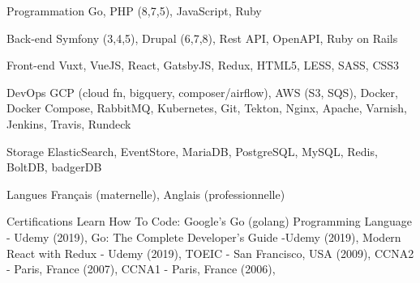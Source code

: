 

\begin{cvskills}

  \cvskill
    {Programmation} %
    {Go, PHP (8,7,5), JavaScript, Ruby} %

  \cvskill
    {Back-end} %
    {Symfony (3,4,5), Drupal (6,7,8), Rest API, OpenAPI, Ruby on Rails} %

  \cvskill
    {Front-end} %
    {Vuxt, VueJS, React, GatsbyJS, Redux, HTML5, LESS, SASS, CSS3} %

  \cvskill
    {DevOps} %
    {GCP (cloud fn, bigquery, composer/airflow), AWS (S3, SQS), Docker, Docker Compose, RabbitMQ, Kubernetes, Git, Tekton, Nginx, Apache, Varnish, Jenkins, Travis, Rundeck} %

  \cvskill
    {Storage} %
    {ElasticSearch, EventStore, MariaDB, PostgreSQL, MySQL, Redis, BoltDB, badgerDB} %

  \cvskill
    {Langues} %
    {Français (maternelle), Anglais (professionnelle)} %

  \cvskill
  {Certifications} %
  {
  Learn How To Code: Google’s Go (golang) Programming Language - Udemy (2019),
  Go: The Complete Developer’s Guide -Udemy (2019),
  Modern React with Redux - Udemy (2019),
  TOEIC - San Francisco, USA (2009),
  CCNA2 - Paris, France (2007),
  CCNA1 - Paris, France (2006),
  } %

\end{cvskills}
